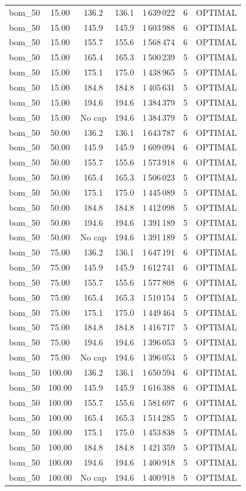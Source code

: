 \begin{longtable}{lcccccc}
bom\_50 & 15.00 & 136.2 & 136.1 & 1\,639\,022 & 6 & OPTIMAL \\
bom\_50 & 15.00 & 145.9 & 145.9 & 1\,603\,988 & 6 & OPTIMAL \\
bom\_50 & 15.00 & 155.7 & 155.6 & 1\,568\,474 & 6 & OPTIMAL \\
bom\_50 & 15.00 & 165.4 & 165.3 & 1\,500\,239 & 5 & OPTIMAL \\
bom\_50 & 15.00 & 175.1 & 175.0 & 1\,438\,965 & 5 & OPTIMAL \\
bom\_50 & 15.00 & 184.8 & 184.8 & 1\,405\,631 & 5 & OPTIMAL \\
bom\_50 & 15.00 & 194.6 & 194.6 & 1\,384\,379 & 5 & OPTIMAL \\
bom\_50 & 15.00 & No cap & 194.6 & 1\,384\,379 & 5 & OPTIMAL \\
bom\_50 & 50.00 & 136.2 & 136.1 & 1\,643\,787 & 6 & OPTIMAL \\
bom\_50 & 50.00 & 145.9 & 145.9 & 1\,609\,094 & 6 & OPTIMAL \\
bom\_50 & 50.00 & 155.7 & 155.6 & 1\,573\,918 & 6 & OPTIMAL \\
bom\_50 & 50.00 & 165.4 & 165.3 & 1\,506\,023 & 5 & OPTIMAL \\
bom\_50 & 50.00 & 175.1 & 175.0 & 1\,445\,089 & 5 & OPTIMAL \\
bom\_50 & 50.00 & 184.8 & 184.8 & 1\,412\,098 & 5 & OPTIMAL \\
bom\_50 & 50.00 & 194.6 & 194.6 & 1\,391\,189 & 5 & OPTIMAL \\
bom\_50 & 50.00 & No cap & 194.6 & 1\,391\,189 & 5 & OPTIMAL \\
bom\_50 & 75.00 & 136.2 & 136.1 & 1\,647\,191 & 6 & OPTIMAL \\
bom\_50 & 75.00 & 145.9 & 145.9 & 1\,612\,741 & 6 & OPTIMAL \\
bom\_50 & 75.00 & 155.7 & 155.6 & 1\,577\,808 & 6 & OPTIMAL \\
bom\_50 & 75.00 & 165.4 & 165.3 & 1\,510\,154 & 5 & OPTIMAL \\
bom\_50 & 75.00 & 175.1 & 175.0 & 1\,449\,464 & 5 & OPTIMAL \\
bom\_50 & 75.00 & 184.8 & 184.8 & 1\,416\,717 & 5 & OPTIMAL \\
bom\_50 & 75.00 & 194.6 & 194.6 & 1\,396\,053 & 5 & OPTIMAL \\
bom\_50 & 75.00 & No cap & 194.6 & 1\,396\,053 & 5 & OPTIMAL \\
bom\_50 & 100.00 & 136.2 & 136.1 & 1\,650\,594 & 6 & OPTIMAL \\
bom\_50 & 100.00 & 145.9 & 145.9 & 1\,616\,388 & 6 & OPTIMAL \\
bom\_50 & 100.00 & 155.7 & 155.6 & 1\,581\,697 & 6 & OPTIMAL \\
bom\_50 & 100.00 & 165.4 & 165.3 & 1\,514\,285 & 5 & OPTIMAL \\
bom\_50 & 100.00 & 175.1 & 175.0 & 1\,453\,838 & 5 & OPTIMAL \\
bom\_50 & 100.00 & 184.8 & 184.8 & 1\,421\,359 & 5 & OPTIMAL \\
bom\_50 & 100.00 & 194.6 & 194.6 & 1\,400\,918 & 5 & OPTIMAL \\
bom\_50 & 100.00 & No cap & 194.6 & 1\,400\,918 & 5 & OPTIMAL \\
\end{longtable}
\endgroup
